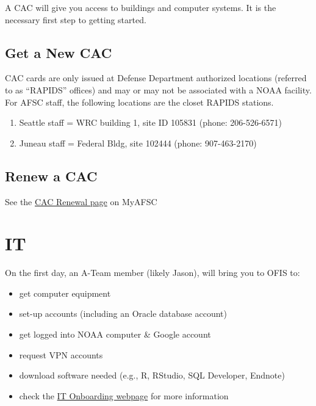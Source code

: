 \documentclass[
  letterpaper,
  DIV=11,
  numbers=noendperiod]{scrreprt}
\providecommand{\tightlist}{%
  \setlength{\itemsep}{0pt}\setlength{\parskip}{0pt}}\usepackage{longtable,booktabs,array}
\begin{document}
A CAC will give you access to buildings and computer systems. It is the
necessary first step to getting started.

\hypertarget{get-a-new-cac}{%
\subsection{Get a New CAC}\label{get-a-new-cac}}

CAC cards are only issued at Defense Department authorized locations
(referred to as ``RAPIDS'' offices) and may or may not be associated
with a NOAA facility. For AFSC staff, the following locations are the
closet RAPIDS stations.

\begin{enumerate}
\def\labelenumi{\arabic{enumi}.}
\item
  Seattle staff = WRC building 1, site ID 105831 (phone: 206-526-6571)
\item
  Juneau staff = Federal Bldg, site 102444 (phone: 907-463-2170)
\end{enumerate}

\hypertarget{renew-a-cac}{%
\subsection{Renew a CAC}\label{renew-a-cac}}

See the
\href{https://sites.google.com/noaa.gov/myafsc/administrative/security/cac-renewal}{CAC
Renewal page} on MyAFSC

\hypertarget{it}{%
\section{IT}\label{it}}

On the first day, an A-Team member (likely Jason), will bring you to
OFIS to:

\begin{itemize}
\tightlist
\item
  get computer equipment
\item
  set-up accounts (including an Oracle database account)
\item
  get logged into NOAA computer \& Google account
\item
  request VPN accounts
\item
  download software needed (e.g., R, RStudio, SQL Developer, Endnote)
\item
  check the
  \href{https://sites.google.com/noaa.gov/myafsc/technology/onboarding-and-clearing-it}{IT
  Onboarding webpage} for more information
\end{itemize}
\end{document}
